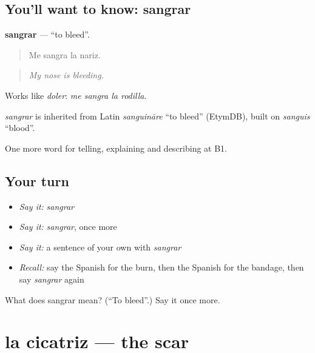 \subsection*{You'll want to know: sangrar}
\textbf{sangrar} — \textquotedblleft{}to bleed\textquotedblright{}.

\begin{quote}
Me sangra la nariz.
\end{quote}

\begin{quote}
\emph{My nose is bleeding.}
\end{quote}

Works like \emph{doler}: \emph{me sangra la rodilla}.

\begin{cousinweb}
\emph{sangrar} is inherited from Latin \emph{sanguināre} \textquotedblleft{}to bleed\textquotedblright{} (EtymDB), built on \emph{sanguis} \textquotedblleft{}blood\textquotedblright{}.
\end{cousinweb}

\begin{grammarlens}[title={What you've built}]
One more word for telling, explaining and describing at B1.
\end{grammarlens}

\subsection*{Your turn}
\begin{itemize}
\raggedright
  \item \emph{Say it:} \emph{sangrar}
  \item \emph{Say it:} \emph{sangrar}, once more
  \item \emph{Say it:} a sentence of your own with \emph{sangrar}
  \item \emph{Recall:} say the Spanish for the burn, then the Spanish for the bandage, then say \emph{sangrar} again
\end{itemize}

\begin{tcolorbox}[breakable,colback=teal!4,colframe=teal!35!black,title={Before you move on}]
What does sangrar mean? (\textquotedblleft{}To bleed\textquotedblright{}.) Say it once more.
\end{tcolorbox}
\section[la cicatriz]{la cicatriz — the scar}


